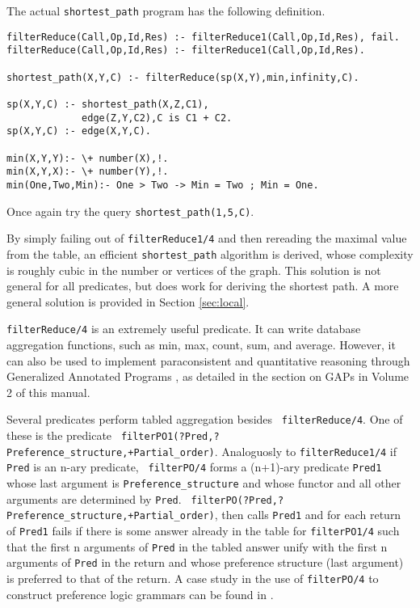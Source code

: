 \begin{exercise}
The actual {\tt shortest\_path} program has the following definition.
\begin{center}
\begin{minipage}{3.8in}
\begin{verbatim}
filterReduce(Call,Op,Id,Res) :- filterReduce1(Call,Op,Id,Res), fail.
filterReduce(Call,Op,Id,Res) :- filterReduce1(Call,Op,Id,Res).

shortest_path(X,Y,C) :- filterReduce(sp(X,Y),min,infinity,C).

sp(X,Y,C) :- shortest_path(X,Z,C1),
             edge(Z,Y,C2),C is C1 + C2.
sp(X,Y,C) :- edge(X,Y,C).

min(X,Y,Y):- \+ number(X),!.
min(X,Y,X):- \+ number(Y),!.
min(One,Two,Min):- One > Two -> Min = Two ; Min = One.
\end{verbatim}						       
\end{minipage}
\end{center}
Once again try the query {\tt shortest\_path(1,5,C)}.
\end{exercise}

By simply failing out of {\tt filterReduce1/4} and then rereading the
maximal value from the table, an efficient {\tt shortest\_path}
algorithm is derived, whose complexity is roughly cubic in the number
or vertices of the graph.  This solution is not general for all
predicates, but does work for deriving the shortest path.  A more
general solution is provided in Section \ref{sec:local}.

{\tt filterReduce/4} is an extremely useful predicate.  It can write
database aggregation functions, such as min, max, count, sum, and
average.  However, it can also be used to implement paraconsistent and
quantitative reasoning through Generalized Annotated Programs
\cite{KiSu92}, as detailed in the section on GAPs in Volume 2 of this
manual.

Several predicates perform tabled aggregation besides {\tt
filterReduce/4}.  One of these is the predicate {\tt
filterPO1(?Pred,?Preference\_structure,+Partial\_order)}.  Analoguosly
to {\tt filterReduce1/4} if {\tt Pred} is an n-ary predicate, {\tt
filterPO/4} forms a (n+1)-ary predicate {\tt Pred1} whose last
argument is {\tt Preference\_structure} and whose functor and all
other arguments are determined by {\tt Pred}.  {\tt
filterPO(?Pred,?Preference\_structure,+Partial\_order)}, then calls
{\tt Pred1} and for each return of {\tt Pred1} fails if there is some
answer already in the table for {\tt filterPO1/4} such that the first
n arguments of {\tt Pred} in the tabled answer unify with the first n
arguments of {\tt Pred} in the return and whose preference structure
(last argument) is preferred to that of the return.  A case study in
the use of {\tt filterPO/4} to construct preference logic grammars can
be found in \cite{CuSW99}.

